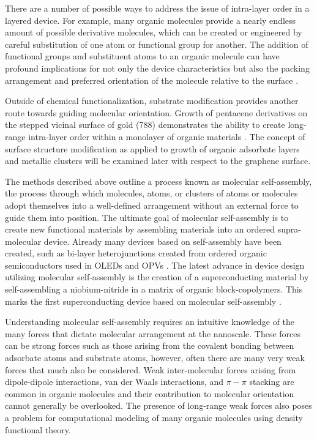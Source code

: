 There are a number of possible ways to address the issue of intra-layer order in a layered device. For example, many organic molecules provide a nearly endless amount of possible derivative molecules, which can be created or engineered by careful substitution of one atom or functional group for another. The addition of functional groups and substituent atoms to an organic molecule can have profound implications for not only the device characteristics but also the packing arrangement and preferred orientation of the molecule relative to the surface \cite{amanda-ttpo, bogdanc60}.

Outside of chemical functionalization, substrate modification provides another route towards guiding molecular orientation. Growth of pentacene derivatives on the stepped vicinal surface of gold (788) demonstrates the ability to create long-range intra-layer order within a monolayer of organic materials \cite{wang-nano}. The concept of surface structure modification as applied to growth of organic adsorbate layers and metallic clusters will be examined later with respect to the graphene surface.

The methods described above outline a process known as molecular self-assembly, the process through which molecules, atoms, or clusters of atoms or molecules adopt themselves into a well-defined arrangement without an external force to guide them into position. The ultimate goal of molecular self-assembly is to create new functional materials by assembling materials into an ordered supra-molecular device. Already many devices based on self-assembly have been created, such as bi-layer heterojunctions created from ordered organic semiconductors used in OLEDs and OPVs \cite{opv-self-assembly}. The latest advance in device design utilizing molecular self-assembly is the creation of a superconducting material by self-assembling a niobium-nitride in a matrix of organic block-copolymers. This marks the first superconducting device based on molecular self-assembly \cite{superconductor-self-assembly}.

Understanding molecular self-assembly requires an intuitive knowledge of the many forces that dictate molecular arrangement at the nanoscale. These forces can be strong forces such as those arising from the covalent bonding between adsorbate atoms and substrate atoms, however, often there are many very weak forces that much also be considered. Weak inter-molecular forces arising from dipole-dipole interactions, van der Waals interactions, and $\pi-\pi$ stacking are common in organic molecules and their contribution to molecular orientation cannot generally be overlooked. The presence of long-range weak forces also poses a problem for computational modeling of many organic molecules using density functional theory.

